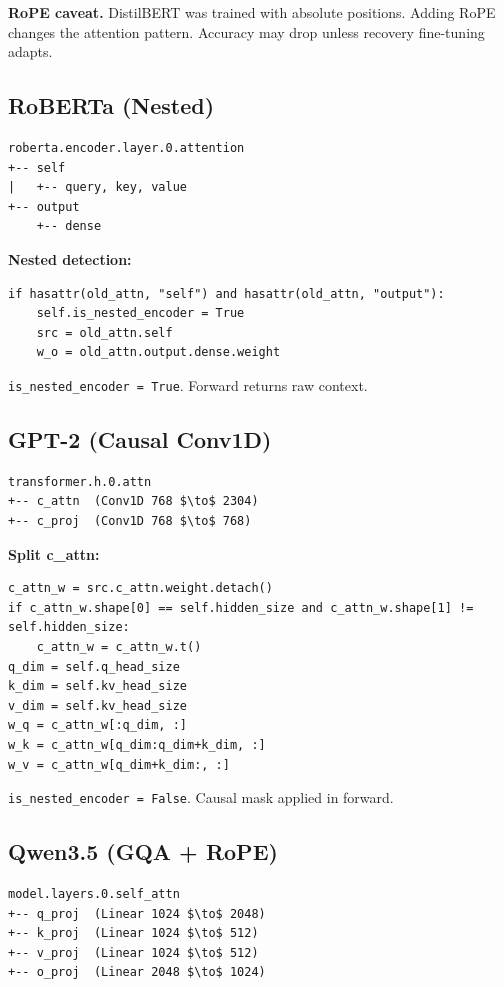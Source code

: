 \textbf{RoPE caveat.} DistilBERT was trained with absolute positions. Adding 
RoPE changes the attention pattern. Accuracy may drop unless recovery 
fine-tuning adapts.

\subsection{RoBERTa (Nested)}

\begin{lstlisting}
roberta.encoder.layer.0.attention
+-- self
|   +-- query, key, value
+-- output
    +-- dense
\end{lstlisting}

\textbf{Nested detection:}
\begin{lstlisting}
if hasattr(old_attn, "self") and hasattr(old_attn, "output"):
    self.is_nested_encoder = True
    src = old_attn.self
    w_o = old_attn.output.dense.weight
\end{lstlisting}

\texttt{is\_nested\_encoder = True}. Forward returns raw context.

\subsection{GPT-2 (Causal Conv1D)}

\begin{lstlisting}
transformer.h.0.attn
+-- c_attn  (Conv1D 768 $\to$ 2304)
+-- c_proj  (Conv1D 768 $\to$ 768)
\end{lstlisting}

\textbf{Split c\_attn:}
\begin{lstlisting}
c_attn_w = src.c_attn.weight.detach()
if c_attn_w.shape[0] == self.hidden_size and c_attn_w.shape[1] != self.hidden_size:
    c_attn_w = c_attn_w.t()
q_dim = self.q_head_size
k_dim = self.kv_head_size
v_dim = self.kv_head_size
w_q = c_attn_w[:q_dim, :]
w_k = c_attn_w[q_dim:q_dim+k_dim, :]
w_v = c_attn_w[q_dim+k_dim:, :]
\end{lstlisting}

\texttt{is\_nested\_encoder = False}. Causal mask applied in forward.

\subsection{Qwen3.5 (GQA + RoPE)}

\begin{lstlisting}
model.layers.0.self_attn
+-- q_proj  (Linear 1024 $\to$ 2048)
+-- k_proj  (Linear 1024 $\to$ 512)
+-- v_proj  (Linear 1024 $\to$ 512)
+-- o_proj  (Linear 2048 $\to$ 1024)
\end{lstlisting}

